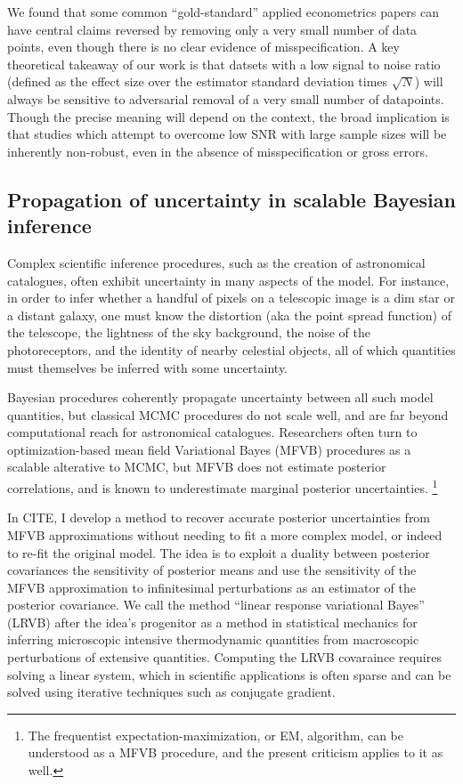 We found that some common ``gold-standard'' applied econometrics papers
can have central claims reversed by removing only a very small number of
data points, even though there is no clear evidence of misspecification.
A key theoretical takeaway of our work is that datsets with a low signal
to noise ratio (defined as the effect size over the estimator standard
deviation times $\sqrt{N}$) will always be sensitive to adversarial removal
of a very small number of datapoints.  Though the precise meaning will
depend on the context, the broad implication is that studies which
attempt to overcome low SNR with large sample sizes will be inherently
non-robust, even in the absence of misspecification or gross errors.


\subsection{Propagation of uncertainty in scalable Bayesian inference}

Complex scientific inference procedures, such as the creation of astronomical
catalogues, often exhibit uncertainty in many aspects of the model.  For
instance, in order to infer whether a handful of pixels on a telescopic image is
a dim star or a distant galaxy, one must know the distortion (aka the point
spread function) of the telescope, the lightness of the sky background, the
noise of the photoreceptors, and the identity of nearby celestial objects, all
of which quantities must themselves be inferred with some uncertainty.

Bayesian procedures coherently propagate uncertainty between all such model
quantities, but classical MCMC procedures do not scale well, and are far beyond
computational reach for astronomical catalogues.  Researchers often turn to
optimization-based mean field Variational Bayes (MFVB) procedures as a scalable
alterative to MCMC, but MFVB does not estimate posterior correlations, and is
known to underestimate marginal posterior uncertainties.
\footnote{The frequentist expectation-maximization, or EM, algorithm,
can be understood as a MFVB procedure, and the present criticism applies
to it as well.}

In CITE, I develop a method to recover accurate posterior uncertainties from
MFVB approximations without needing to fit a more complex model, or indeed to
re-fit the original model.  The idea is to exploit a duality between posterior
covariances the sensitivity of posterior means and use the sensitivity of the
MFVB approximation to infinitesimal perturbations as an estimator of the
posterior covariance.  We call the method ``linear response variational Bayes''
(LRVB) after the idea's progenitor as a method in statistical mechanics for
inferring microscopic intensive thermodynamic quantities from macroscopic
perturbations of extensive quantities.  Computing the LRVB covaraince requires
solving a linear system, which in scientific applications is often sparse and
can be solved using iterative techniques such as conjugate gradient.

